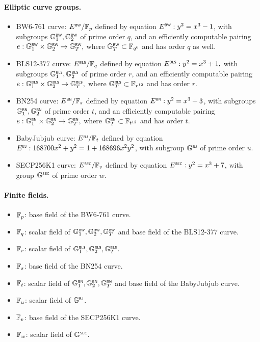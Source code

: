 \paragraph{Elliptic curve groups.}
\begin{itemize}
	\item BW6-761 curve: $\BW{E}/\F_p$ defined by equation $\BW{E}: y^2 = x^3 - 1$, with subgroups $\BW{\G}_1, \BW{\G}_2$ of prime order $q$, and an efficiently computable pairing \({e}:\BW{\G}_1\times\BW{\G}_2 \rightarrow \BW{\G}_T,\) where $\BW{\G}_T \subset \F_{q^{6}}$ and has order $q$ as well. 
	\item BLS12-377 curve: $\BLS{E}/\F_q$ defined by equation \(\BLS{E}: y^2 = x^3 + 1,\) with subgroups $\BLS{\G}_1, \BLS{\G}_2$ of prime order $r$, and an efficiently computable pairing \({e}:\BLS{\G}_1\times\BLS{\G}_2 \rightarrow \BLS{\G}_T,\) where $\BLS{\G}_T \subset \F_{r^{12}}$ and has order $r$. 
	\item BN254 curve: $\BN{E}/\F_s$ defined by equation \( \BN{E}: y^2 = x^3 + 3\), with subgroups $\BN{\G}_1, \BN{\G}_2$ of prime order $t$, and an efficiently computable pairing \(e:\BN{\G}_1\times\BN{\G}_2 \rightarrow \BN{\G}_T,\) where $\BN{\G}_T \subset \F_{t^{12}}$ and has order $t$. 
	\item BabyJubjub curve: $\BJ{E}/\F_t$ defined by equation $\BJ{E}: 168700 x^2 + y^2 = 1 + 168696 x^2y^2$, with subgroup $\BJ{\G}$ of prime order $u$. 
	\item SECP256K1 curve: $\SEC{E}/\F_v$ defined by equation $\SEC{E}: y^2 = x^3 + 7$, with group $\SEC{\G}$ of prime order $w$. 
\end{itemize}

\paragraph{Finite fields.}
\begin{itemize}
	\item $\F_p$: base field of the BW6-761 curve.
	\item $\F_q$: scalar field of $\BW{\G}_1, \BW{\G}_2, \BW{\G}_T$ and base field of the BLS12-377 curve.
	\item $\F_r$: scalar field of $\BLS{\G}_1, \BLS{\G}_2, \BLS{\G}_T$.
	\item $\F_s$: base field of the BN254 curve.	
	\item $\F_t$: scalar field of $\BN{\G}_1, \BN{\G}_2, \BN{\G}_T$ and base field of the BabyJubjub curve.
	\item $\F_u$: scalar field of $\BJ{\G}$.
	\item $\F_v$: base field of the SECP256K1 curve.
	\item $\F_w$: scalar field of $\SEC{\G}$.
\end{itemize}

